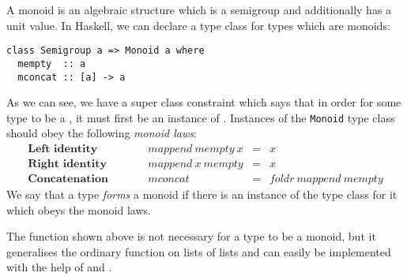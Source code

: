A monoid is an algebraic structure which is a semigroup and additionally has a unit value. In Haskell, we can declare a type class for types which are monoids:
\begin{verbatim}
class Semigroup a => Monoid a where
  mempty  :: a
  mconcat :: [a] -> a
\end{verbatim}
As we can see, we have a super class constraint which says that in order for some type  to be a , it must first be an instance of . Instances of the \texttt{Monoid} type class should obey the following \emph{monoid laws}:
\begin{displaymath}
\begin{array}{lcrcl}
\textbf{Left identity} &\qquad & \mathit{mappend}~\mathit{mempty}~x & = & x \\
\textbf{Right identity} &\qquad & \mathit{mappend}~x~\mathit{mempty} & = & x \\
\textbf{Concatenation} & \qquad & \mathit{mconcat} & = & \mathit{foldr}~\mathit{mappend}~\mathit{mempty}
\end{array}
\end{displaymath}
We say that a type \emph{forms} a monoid if there is an instance of the  type class for it which obeys the monoid laws. 

The  function shown above is not necessary for a type to be a monoid, but it generalises the ordinary  function on lists of lists and can easily be implemented with the help of \haskellIn{(<>)} and .

\taskLine 



\taskLine



